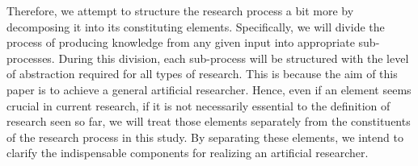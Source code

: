 Therefore, we attempt to structure the research process a bit more by decomposing it into its constituting elements. Specifically, we will divide the process of producing knowledge from any given input into appropriate sub-processes. During this division, each sub-process will be structured with the level of abstraction required for all types of research. This is because the aim of this paper is to achieve a general artificial researcher. Hence, even if an element seems crucial in current research, if it is not necessarily essential to the definition of research seen so far, we will treat those elements separately from the constituents of the research process in this study. By separating these elements, we intend to clarify the indispensable components for realizing an artificial researcher. 




